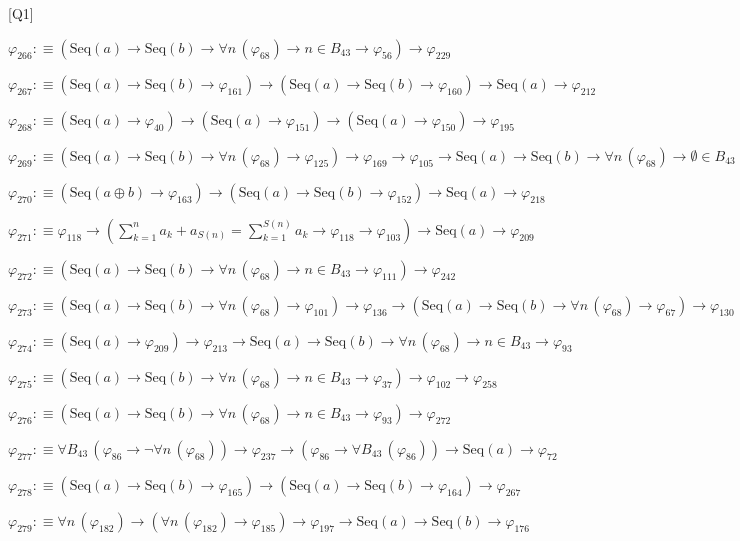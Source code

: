\begin{fullproof}{[Q1]}
\begin{abbrevlist}
\item $\varphi_{266} :\equiv (\mathrm{Seq}(a) \to \mathrm{Seq}(b) \to \forall n\,(\varphi_{68}) \to n \in B_{43} \to \varphi_{56}) \to \varphi_{229}$
\item $\varphi_{267} :\equiv (\mathrm{Seq}(a) \to \mathrm{Seq}(b) \to \varphi_{161}) \to (\mathrm{Seq}(a) \to \mathrm{Seq}(b) \to \varphi_{160}) \to \mathrm{Seq}(a) \to \varphi_{212}$
\item $\varphi_{268} :\equiv (\mathrm{Seq}(a) \to \varphi_{40}) \to (\mathrm{Seq}(a) \to \varphi_{151}) \to (\mathrm{Seq}(a) \to \varphi_{150}) \to \varphi_{195}$
\item $\varphi_{269} :\equiv (\mathrm{Seq}(a) \to \mathrm{Seq}(b) \to \forall n\,(\varphi_{68}) \to \varphi_{125}) \to \varphi_{169} \to \varphi_{105} \to \mathrm{Seq}(a) \to \mathrm{Seq}(b) \to \forall n\,(\varphi_{68}) \to \emptyset \in B_{43}$
\item $\varphi_{270} :\equiv (\mathrm{Seq}(a \oplus b) \to \varphi_{163}) \to (\mathrm{Seq}(a) \to \mathrm{Seq}(b) \to \varphi_{152}) \to \mathrm{Seq}(a) \to \varphi_{218}$
\item $\varphi_{271} :\equiv \varphi_{118} \to ({\textstyle\sum_{k=1}^{n} a_{k}} + a_{S(n)} = {\textstyle\sum_{k=1}^{S(n)} a_{k}} \to \varphi_{118} \to \varphi_{103}) \to \mathrm{Seq}(a) \to \varphi_{209}$
\item $\varphi_{272} :\equiv (\mathrm{Seq}(a) \to \mathrm{Seq}(b) \to \forall n\,(\varphi_{68}) \to n \in B_{43} \to \varphi_{111}) \to \varphi_{242}$
\item $\varphi_{273} :\equiv (\mathrm{Seq}(a) \to \mathrm{Seq}(b) \to \forall n\,(\varphi_{68}) \to \varphi_{101}) \to \varphi_{136} \to (\mathrm{Seq}(a) \to \mathrm{Seq}(b) \to \forall n\,(\varphi_{68}) \to \varphi_{67}) \to \varphi_{130}$
\item $\varphi_{274} :\equiv (\mathrm{Seq}(a) \to \varphi_{209}) \to \varphi_{213} \to \mathrm{Seq}(a) \to \mathrm{Seq}(b) \to \forall n\,(\varphi_{68}) \to n \in B_{43} \to \varphi_{93}$
\item $\varphi_{275} :\equiv (\mathrm{Seq}(a) \to \mathrm{Seq}(b) \to \forall n\,(\varphi_{68}) \to n \in B_{43} \to \varphi_{37}) \to \varphi_{102} \to \varphi_{258}$
\item $\varphi_{276} :\equiv (\mathrm{Seq}(a) \to \mathrm{Seq}(b) \to \forall n\,(\varphi_{68}) \to n \in B_{43} \to \varphi_{93}) \to \varphi_{272}$
\item $\varphi_{277} :\equiv \forall B_{43}\,(\varphi_{86} \to \neg \forall n\,(\varphi_{68})) \to \varphi_{237} \to (\varphi_{86} \to \forall B_{43}\,(\varphi_{86})) \to \mathrm{Seq}(a) \to \varphi_{72}$
\item $\varphi_{278} :\equiv (\mathrm{Seq}(a) \to \mathrm{Seq}(b) \to \varphi_{165}) \to (\mathrm{Seq}(a) \to \mathrm{Seq}(b) \to \varphi_{164}) \to \varphi_{267}$
\item $\varphi_{279} :\equiv \forall n\,(\varphi_{182}) \to (\forall n\,(\varphi_{182}) \to \varphi_{185}) \to \varphi_{197} \to \mathrm{Seq}(a) \to \mathrm{Seq}(b) \to \varphi_{176}$
\end{abbrevlist}
\end{fullproof}
